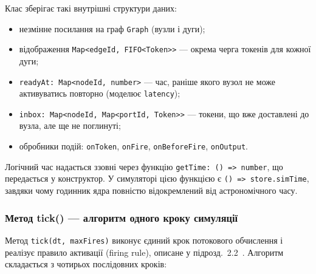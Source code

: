Клас зберігає такі внутрішні структури даних:
\begin{itemize}
  \item незмінне посилання на граф \texttt{Graph} (вузли і дуги);
  \item відображення \texttt{Map<edgeId, FIFO<Token>>} --- окрема
        черга токенів для кожної дуги;
  \item \texttt{readyAt: Map<nodeId, number>} --- час, раніше якого
        вузол не може активуватись повторно (моделює \texttt{latency});
  \item \texttt{inbox: Map<nodeId, Map<portId, Token>>} --- токени,
        що вже доставлені до вузла, але ще не поглинуті;
  \item обробники подій: \texttt{onToken}, \texttt{onFire},
        \texttt{onBeforeFire}, \texttt{onOutput}.
\end{itemize}

Логічний час надається ззовні через функцію
\texttt{getTime: () => number}, що передається у конструктор. У
симуляторі цією функцією є \texttt{() => store.simTime}, завдяки чому
годинник ядра повністю відокремлений від астрономічного часу.

\subsubsection*{Метод tick() --- алгоритм одного кроку симуляції}

Метод \texttt{tick(dt, maxFires)} виконує єдиний крок потокового
обчислення і реалізує правило активації (firing rule), описане у
підрозд.~2.2~\cite{veen1986,dennis1975}. Алгоритм складається
з чотирьох послідовних кроків:

